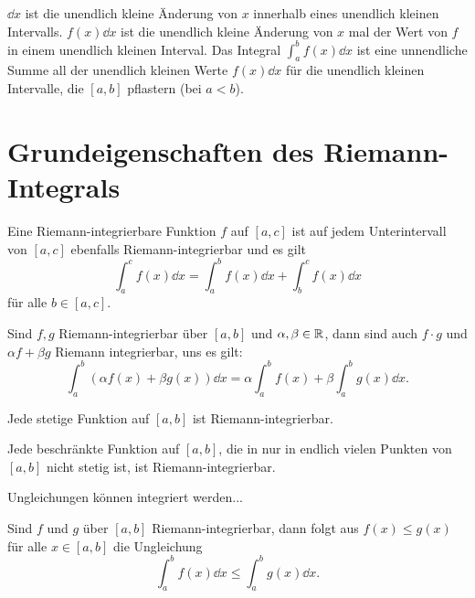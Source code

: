 \begin{bem}
	$\dd x$ ist die unendlich kleine Änderung von $x$ innerhalb eines unendlich kleinen Intervalls. 
	$f(x) \dd x$ ist die unendlich kleine Änderung von $x$ mal der Wert von $f$ in einem unendlich kleinen Interval. Das Integral $\int_a^b f(x) \dd x$ ist eine unnendliche Summe all der unendlich kleinen Werte $f(x) \dd x$ für die unendlich kleinen Intervalle, die $[a,b]$ pflastern (bei $a<b$). 
\end{bem} 



\section{Grundeigenschaften des Riemann-Integrals} 

\begin{thm} 
	Eine Riemann-integrierbare Funktion $f$ auf $[a,c]$ ist auf jedem Unterintervall von $[a,c]$ ebenfalls Riemann-integrierbar und es gilt
	\[
	\int_a^c f(x) \dd x = \int_a^b f(x) \dd x+ \int_b^c f(x) \dd x
	\]
	für alle $b \in [a,c]$. 
\end{thm} 


\begin{thm} 
	Sind $f, g$ Riemann-integrierbar über $[a,b]$ und $\alpha, \beta \in \mathbb{R}$, dann sind auch $f \cdot g$ und $\alpha f + \beta g$ Riemann integrierbar, uns es gilt: 
	\[
			\int_a^b (\alpha f(x) + \beta g(x) ) \dd x = \alpha \int_a^b f(x) + \beta \int_a^b g(x) \dd x. 
	\]
\end{thm} 

\begin{thm} 
	Jede stetige Funktion auf $[a,b]$ ist Riemann-integrierbar. 
\end{thm} 

\begin{thm}
	Jede beschränkte Funktion auf $[a,b]$, die in nur in endlich vielen Punkten von $[a,b]$ nicht stetig ist, ist Riemann-integrierbar. 
\end{thm} 

\begin{bem}
	Ungleichungen können integriert werden...
\end{bem} 

\begin{thm}
	Sind $f$ und $g$ über $[a,b]$ Riemann-integrierbar, dann folgt aus $f(x) \le g(x)$ für alle $x \in [a,b]$ die Ungleichung 
	\[
		\int_a^b f(x) \dd x \le \int_a^b g(x) \dd x.
	\]
\end{thm} 


